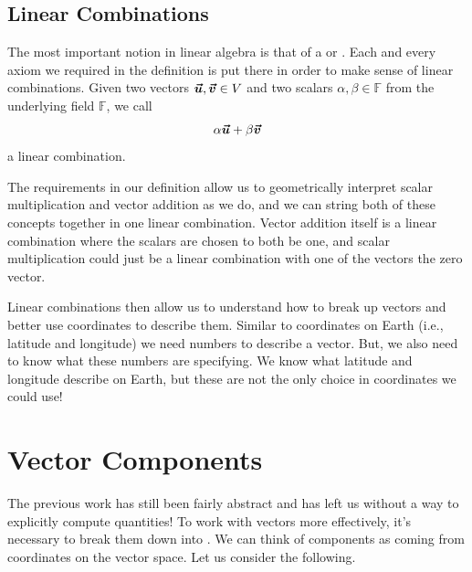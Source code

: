         \subsection{Linear Combinations}
        
        The most important notion in linear algebra is that of a  or .  Each and every axiom we required in the definition is put there in order to make sense of linear combinations.  Given two vectors $\boldsymbol{\boldsymbol{\vec{u}}},\boldsymbol{\boldsymbol{\vec{v}}}\in V$ and two scalars $\alpha, \beta \in \mathbb{F}$ from the underlying field $\mathbb{F}$, we call 
        \[
        \alpha \boldsymbol{\boldsymbol{\vec{u}}} + \beta \boldsymbol{\boldsymbol{\vec{v}}}
        \]
        a linear combination.  
        
        The requirements in our definition allow us to geometrically interpret scalar multiplication and vector addition as we do, and we can string both of these concepts together in one linear combination.  Vector addition itself is a linear combination where the scalars are chosen to both be one, and scalar multiplication could just be a linear combination with one of the vectors the zero vector.
        
        Linear combinations then allow us to understand how to break up vectors and better use coordinates to describe them.  Similar to coordinates on Earth (i.e., latitude and longitude) we need numbers to describe a vector. But, we also need to know what these numbers are specifying.  We know what latitude and longitude describe on Earth, but these are not the only choice in coordinates we could use!
        
        \section{Vector Components}
        The previous work has still been fairly abstract and has left us without a way to explicitly compute quantities! To work with vectors more effectively, it's necessary to break them down into . We can think of components as coming from coordinates on the vector space. Let us consider the following.
        
